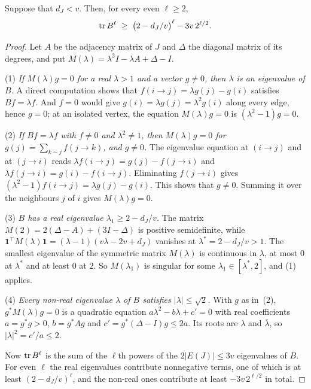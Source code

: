 \begin{lemma}\label{lem:spectrum}
Suppose that $d_J<v$. Then, for every even $\ell\ge2$,
\[
  \operatorname{tr} B^{\ell}\;\ge\;\bigl(2-d_J/v\bigr)^{\ell}-3v\,2^{\ell/2}.
\]
\end{lemma}

\begin{proof}
Let $A$ be the adjacency matrix of $J$ and $\Delta$ the diagonal matrix of its degrees, and put
$M(\lambda)=\lambda^{2}I-\lambda A+\Delta-I$.

(1) \emph{If $M(\lambda)g=0$ for a real $\lambda>1$ and a vector $g\ne0$, then $\lambda$ is an
eigenvalue of $B$.} A direct computation shows that $f(i\to j)=\lambda g(j)-g(i)$ satisfies
$Bf=\lambda f$. And $f=0$ would give $g(i)=\lambda g(j)=\lambda^{2}g(i)$ along every edge, hence
$g=0$; at an isolated vertex, the equation $M(\lambda)g=0$ is $(\lambda^{2}-1)g=0$.

(2) \emph{If $Bf=\lambda f$ with $f\ne0$ and $\lambda^{2}\ne1$, then $M(\lambda)g=0$ for
$g(j)=\sum_{k\sim j}f(j\to k)$, and $g\ne0$.} The eigenvalue equation at $(i\to j)$ and at
$(j\to i)$ reads $\lambda f(i\to j)=g(j)-f(j\to i)$ and $\lambda f(j\to i)=g(i)-f(i\to j)$.
Eliminating $f(j\to i)$ gives $(\lambda^{2}-1)f(i\to j)=\lambda g(j)-g(i)$. This shows that
$g\ne0$. Summing it over the neighbours $j$ of $i$ gives $M(\lambda)g=0$.

(3) \emph{$B$ has a real eigenvalue $\lambda_1\ge2-d_J/v$.} The matrix
$M(2)=2(\Delta-A)+(3I-\Delta)$ is positive semidefinite, while
$\mathbf{1}^{\!\top}M(\lambda)\mathbf{1}=(\lambda-1)(v\lambda-2v+d_J)$ vanishes at
$\lambda^{*}=2-d_J/v>1$. The smallest eigenvalue of the symmetric matrix $M(\lambda)$ is continuous
in $\lambda$, at most $0$ at $\lambda^{*}$ and at least $0$ at $2$. So $M(\lambda_1)$ is singular for
some $\lambda_1\in[\lambda^{*},2]$, and (1) applies.

(4) \emph{Every non-real eigenvalue $\lambda$ of $B$ satisfies $|\lambda|\le\sqrt2$.} With $g$ as
in~(2), $g^{*}M(\lambda)g=0$ is a quadratic equation $a\lambda^{2}-b\lambda+c'=0$ with real
coefficients $a=g^{*}g>0$, $b=g^{*}Ag$ and $c'=g^{*}(\Delta-I)g\le2a$. Its roots are $\lambda$ and
$\bar\lambda$, so $|\lambda|^{2}=c'/a\le2$.

Now $\operatorname{tr} B^{\ell}$ is the sum of the $\ell$th powers of the $2|E(J)|\le3v$ eigenvalues of $B$. For
even $\ell$ the real eigenvalues contribute nonnegative terms, one of which is at least
$(2-d_J/v)^{\ell}$, and the non-real ones contribute at least $-3v\,2^{\ell/2}$ in total.
\end{proof}

